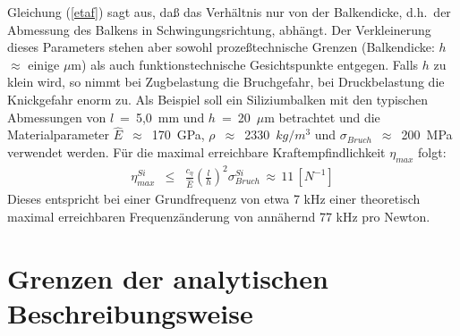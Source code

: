 %
Gleichung (\ref{etaf}) sagt aus, daß das Verhältnis nur von der
Balkendicke, d.h.\ der Abmessung des Balkens in Schwingungsrichtung, abhängt.
Der Verkleinerung dieses Parameters stehen aber sowohl prozeßtechnische
Grenzen (Balkendicke: $h$ $\approx$ einige $\mu$m) als auch
funktionstechnische Gesichtspunkte entgegen. Falls $h$ zu klein wird, so
nimmt bei Zugbelastung die Bruchgefahr, bei Druckbelastung die
Knickgefahr enorm zu. Als Beispiel soll ein Siliziumbalken mit den
typischen Abmessungen von $l$~=~5,0~mm und $h$~=~20~$\mu$m betrachtet
und die Materialparameter $\hat E$~$\approx$~170~GPa,
$\rho$~$\approx$~2330~$kg/m^{3}$ und $\sigma_{Bruch}$~$\approx$~200~MPa
verwendet werden. Für die maximal erreichbare Kraftempfindlichkeit
$\eta_{max}$ folgt:
%
\begin{eqnarray}
     \eta_{max}^{Si} & \leq & \frac{c_{\eta}}{\hat E}
     \left( \frac{l}{h} \right)^{2} \sigma_{Bruch}^{Si} \,
      \approx \, 11 \, [N^{-1}]
\end{eqnarray}
%
Dieses entspricht bei einer Grundfrequenz von etwa 7 kHz einer
theoretisch maximal erreichbaren Frequenzänderung von annähernd 77 kHz
pro Newton.


\newpage
\section{Grenzen der analytischen Beschreibungsweise}
\label{grenzenderanalytik}

